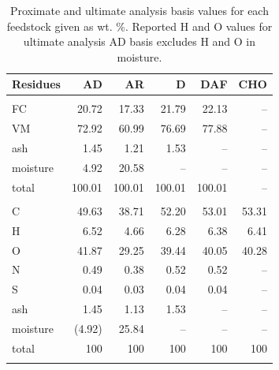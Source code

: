 \newpage
\begin{longtable}{lrrrrr}
    \caption{Proximate and ultimate analysis basis values for each feedstock given as wt. \%. Reported H and O values for ultimate analysis AD basis excludes H and O in moisture.}
    \label{tab:basis} \\

    \textbf{Residues} & AD & AR & D & DAF & CHO \\
    \hline \\
    FC       & 20.72  & 17.33  & 21.79  & 22.13  & -- \\
    VM       & 72.92  & 60.99  & 76.69  & 77.88  & -- \\
    ash      & 1.45   & 1.21   & 1.53   & --     & -- \\
    moisture & 4.92   & 20.58  & --     & --     & -- \\
    total    & 100.01 & 100.01 & 100.01 & 100.01 & -- \\
    \\
    C        & 49.63  & 38.71 & 52.20 & 53.01 & 53.31 \\
    H        & 6.52   & 4.66  & 6.28  & 6.38  & 6.41 \\
    O        & 41.87  & 29.25 & 39.44 & 40.05 & 40.28 \\
    N        & 0.49   & 0.38  & 0.52  & 0.52  & -- \\
    S        & 0.04   & 0.03  & 0.04  & 0.04  & -- \\
    ash      & 1.45   & 1.13  & 1.53  & --    & -- \\
    moisture & (4.92) & 25.84 & --    & --    & -- \\
    total    & 100    & 100   & 100   & 100   & 100 \\
    \\


\end{longtable}
